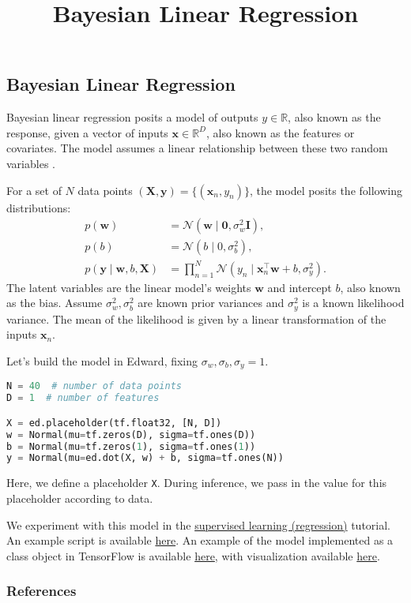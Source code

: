 \title{Bayesian Linear Regression}

\subsection{Bayesian Linear Regression}

Bayesian linear regression posits a model of
outputs $y\in\mathbb{R}$, also known as the response, given
a vector of inputs
$\mathbf{x}\in\mathbb{R}^D$, also known as the features or covariates.
The model assumes a
linear relationship between these two random variables
\citep{murphy2012machine}.

For a set of $N$ data points $(\mathbf{X},\mathbf{y})=\{(\mathbf{x}_n, y_n)\}$,
the model posits the following distributions:
\begin{align*}
  p(\mathbf{w})
  &=
  \mathcal{N}(\mathbf{w} \mid \mathbf{0}, \sigma_w^2\mathbf{I}),
  \\[1.5ex]
  p(b)
  &=
  \mathcal{N}(b \mid 0, \sigma_b^2),
  \\
  p(\mathbf{y} \mid \mathbf{w}, b, \mathbf{X})
  &=
  \prod_{n=1}^N
  \mathcal{N}(y_n \mid \mathbf{x}_n^\top\mathbf{w} + b, \sigma_y^2).
\end{align*}
The latent variables are the linear model's weights $\mathbf{w}$ and
intercept $b$, also known as the bias.
Assume $\sigma_w^2,\sigma_b^2$ are known prior variances and $\sigma_y^2$ is a
known likelihood variance. The mean of the likelihood is given by a
linear transformation of the inputs $\mathbf{x}_n$.

Let's build the model in Edward, fixing $\sigma_w,\sigma_b,\sigma_y=1$.
\begin{lstlisting}[language=Python]
N = 40  # number of data points
D = 1  # number of features

X = ed.placeholder(tf.float32, [N, D])
w = Normal(mu=tf.zeros(D), sigma=tf.ones(D))
b = Normal(mu=tf.zeros(1), sigma=tf.ones(1))
y = Normal(mu=ed.dot(X, w) + b, sigma=tf.ones(N))
\end{lstlisting}
Here, we define a placeholder \texttt{X}. During inference, we pass in
the value for this placeholder according to data.

We experiment with this model in the \href{/tutorials/supervised-regression}{supervised
learning (regression)} tutorial.
An example script is available
\href{https://github.com/blei-lab/edward/blob/master/examples/bayesian_linear_regression.py}
{here}.
An example of the model implemented as a class object in TensorFlow is
available
\href{https://github.com/blei-lab/edward/blob/master/examples/tf_bayesian_linear_regression.py}
{here}, with visualization available
\href{https://github.com/blei-lab/edward/blob/master/examples/tf_bayesian_linear_regression_plot.py}
{here}.

\subsubsection{References}\label{references}
